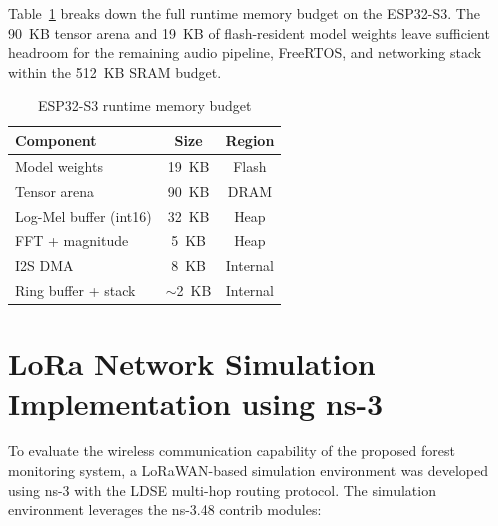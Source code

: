 Table~\ref{tab:memory-budget} breaks down the full runtime memory budget on
the ESP32-S3. The 90~KB tensor arena and 19~KB of flash-resident model
weights leave sufficient headroom for the remaining audio pipeline,
FreeRTOS, and networking stack within the 512~KB SRAM budget.

\begin{table}[H]
    \centering
    \caption{ESP32-S3 runtime memory budget}
    \label{tab:memory-budget}
    \begin{tabular}{lcc}
        \toprule
        \textbf{Component} & \textbf{Size} & \textbf{Region} \\
        \midrule
        Model weights          & 19~KB & Flash \\
        Tensor arena           & 90~KB & DRAM \\
        Log-Mel buffer (int16) & 32~KB & Heap \\
        FFT + magnitude        & 5~KB  & Heap \\
        I2S DMA                & 8~KB  & Internal \\
        Ring buffer + stack    & $\sim$2~KB & Internal \\
        \bottomrule
    \end{tabular}
\end{table}

\section{LoRa Network Simulation Implementation using ns-3}

To evaluate the wireless communication capability of the proposed forest monitoring
system, a LoRaWAN-based simulation environment was developed using ns-3 with the
LDSE multi-hop routing protocol. The simulation environment leverages the ns-3.48
contrib modules:

